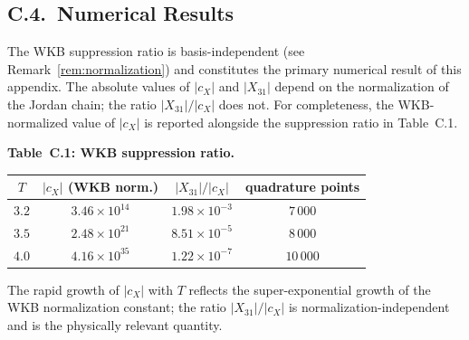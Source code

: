\documentclass[12pt,a4paper]{amsart}
\theoremstyle{remark}
\begin{document}
\subsection*{C.4.~Numerical Results}

The WKB suppression ratio is basis-independent
(see Remark~\ref{rem:normalization}) and constitutes the primary numerical result
of this appendix.
The absolute values of $|c_X|$ and $|X_{31}|$ depend on the normalization
of the Jordan chain; the ratio $|X_{31}|/|c_X|$ does not.
For completeness, the WKB-normalized value of $|c_X|$ is reported alongside
the suppression ratio in Table~C.1.

\medskip
\noindent\textbf{Table~C.1: WKB suppression ratio.}
\begin{center}
\begin{tabular}{cccc}
\hline
$T$ & $|c_X|$ (WKB norm.) & $|X_{31}|/|c_X|$ & quadrature points \\
\hline
$3.2$ & $3.46\times10^{14}$ & $1.98\times10^{-3}$ & $7\,000$ \\
$3.5$ & $2.48\times10^{21}$ & $8.51\times10^{-5}$ & $8\,000$ \\
$4.0$ & $4.16\times10^{35}$ & $1.22\times10^{-7}$ & $10\,000$ \\
\hline
\end{tabular}
\end{center}
The rapid growth of $|c_X|$ with $T$ reflects the super-exponential growth of the
WKB normalization constant; the ratio $|X_{31}|/|c_X|$ is normalization-independent
and is the physically relevant quantity.
\end{document}
